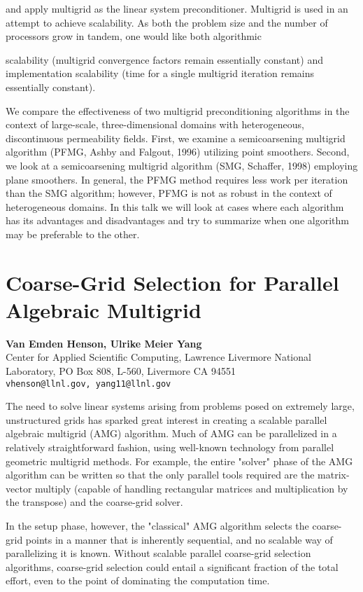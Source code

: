 \documentclass[11pt]{article}
\newcommand{\nextab}[4]{
	\section{#2}
	{\bf #1} \\ \nopagebreak
	{#3} \\ \nopagebreak
	{\tt #4} \nopagebreak
	}
\begin{document}
and apply multigrid as the linear system preconditioner.  Multigrid
is used in an attempt to achieve scalability. As both the problem size
and
the number of processors grow in tandem, one would like both algorithmic

scalability (multigrid convergence factors remain essentially constant)
and
implementation scalability (time for a single multigrid iteration
remains
essentially constant).

We compare the effectiveness of two multigrid preconditioning
algorithms in the context of large-scale, three-dimensional domains
with heterogeneous, discontinuous permeability fields.  First,
we examine a semicoarsening multigrid algorithm
(PFMG, Ashby and Falgout, 1996) utilizing point smoothers.
Second, we look at a semicoarsening multigrid algorithm
(SMG, Schaffer, 1998) employing plane smoothers.
In general, the PFMG method requires less work
per iteration than the SMG algorithm; however, PFMG is not as robust
in the context of heterogeneous domains.  In this talk we will look
at cases where each algorithm has its advantages
and disadvantages and try to summarize when one algorithm may be
preferable to the other.


\nextab{Van Emden Henson, Ulrike Meier Yang}
	{Coarse-Grid Selection for Parallel Algebraic Multigrid}
	{Center for Applied Scientific Computing,
		Lawrence Livermore National Laboratory,
		PO Box 808, L-560, Livermore CA 94551}
	{vhenson@llnl.gov, yang11@llnl.gov}

The need to solve linear systems arising from problems posed on
extremely large, unstructured grids has sparked great interest in
creating a scalable parallel algebraic multigrid (AMG) algorithm. Much
of AMG can be parallelized in a relatively straightforward fashion,
using well-known technology from parallel geometric multigrid
methods. For example, the entire "solver" phase of the AMG algorithm
can be written so that the only parallel tools required are the
matrix-vector multiply (capable of handling rectangular matrices and
multiplication by the transpose) and the coarse-grid solver.

In the setup phase, however, the "classical" AMG algorithm selects
the coarse-grid points in a manner that is inherently sequential, and
no scalable way of parallelizing it is known. Without scalable
parallel coarse-grid selection algorithms, coarse-grid selection could
entail a significant fraction of the total effort, even to the point
of dominating the computation time.
\end{document}
